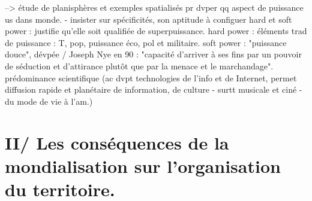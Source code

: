 \documentclass{beamer}
\begin{document}
--> étude de planisphères et exemples spatialisés pr dvper qq aspect de puissance us dans monde.
- insister sur spécificités, son aptitude à configuer hard et soft power : justifie qu'elle soit qualifiée de superpuissance.
hard power : éléments trad de puissance : T, pop, puissance éco, pol et militaire.
soft power : "puissance douce", dévpée / Joseph Nye en 90 : "capacité d'arriver à ses fins par un pouvoir de séduction et d'attirance plutôt que par la menace et le marchandage". prédominance scientifique (ac dvpt technologies de l'info et de Internet, permet diffusion rapide et planétaire de information, de culture - surtt musicale et ciné - du mode de vie à l'am.)


\section{II/ Les conséquences de la mondialisation sur l'organisation du territoire.}

  
\end{document}
